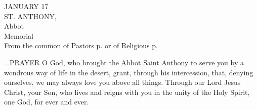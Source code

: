 \begin{center}\normalsize JANUARY 17\\
\footnotesize ST. ANTHONY,\\
\footnotesize Abbot\\
\footnotesize Memorial\\
\footnotesize From the common of Pastors p.   or of Religious p.  \\
\end{center}

\hangindent=\parindent \small{PRAYER 
O God, who brought the Abbot Saint Anthony
to serve you by a wondrous way of life in the desert,
grant, through his intercession,
that, denying ourselves,
we may always love you above all things.
Through our Lord Jesus Christ, your Son,
who lives and reigns with you in the unity of the Holy Spirit,
one God, for ever and ever.
 \\}
 
